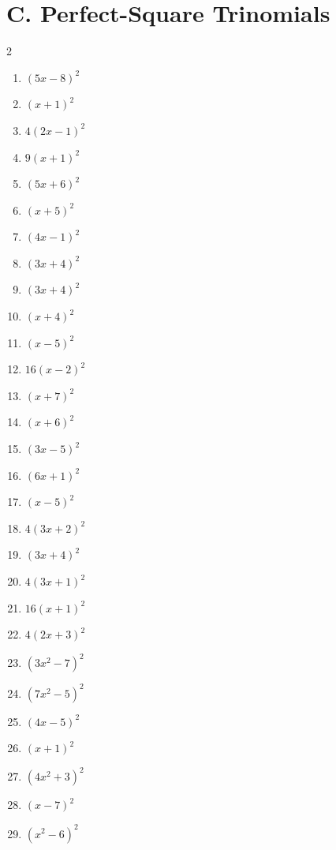 \documentclass[11pt,oneside]{book}
\begin{document}
\section*{C. Perfect-Square Trinomials}
\begin{multicols}{2}
\begin{enumerate}[leftmargin=*,label=\textbf{C\arabic*.},itemsep=0.45\baselineskip]
\item $ \left(5 x - 8\right)^{2} $
\item $ \left(x + 1\right)^{2} $
\item $ 4 \left(2 x - 1\right)^{2} $
\item $ 9 \left(x + 1\right)^{2} $
\item $ \left(5 x + 6\right)^{2} $
\item $ \left(x + 5\right)^{2} $
\item $ \left(4 x - 1\right)^{2} $
\item $ \left(3 x + 4\right)^{2} $
\item $ \left(3 x + 4\right)^{2} $
\item $ \left(x + 4\right)^{2} $
\item $ \left(x - 5\right)^{2} $
\item $ 16 \left(x - 2\right)^{2} $
\item $ \left(x + 7\right)^{2} $
\item $ \left(x + 6\right)^{2} $
\item $ \left(3 x - 5\right)^{2} $
\item $ \left(6 x + 1\right)^{2} $
\item $ \left(x - 5\right)^{2} $
\item $ 4 \left(3 x + 2\right)^{2} $
\item $ \left(3 x + 4\right)^{2} $
\item $ 4 \left(3 x + 1\right)^{2} $
\item $ 16 \left(x + 1\right)^{2} $
\item $ 4 \left(2 x + 3\right)^{2} $
\item $ \left(3 x^{2} - 7\right)^{2} $
\item $ \left(7 x^{2} - 5\right)^{2} $
\item $ \left(4 x - 5\right)^{2} $
\item $ \left(x + 1\right)^{2} $
\item $ \left(4 x^{2} + 3\right)^{2} $
\item $ \left(x - 7\right)^{2} $
\item $ \left(x^{2} - 6\right)^{2} $

\end{enumerate}
\end{multicols}
\end{document}
